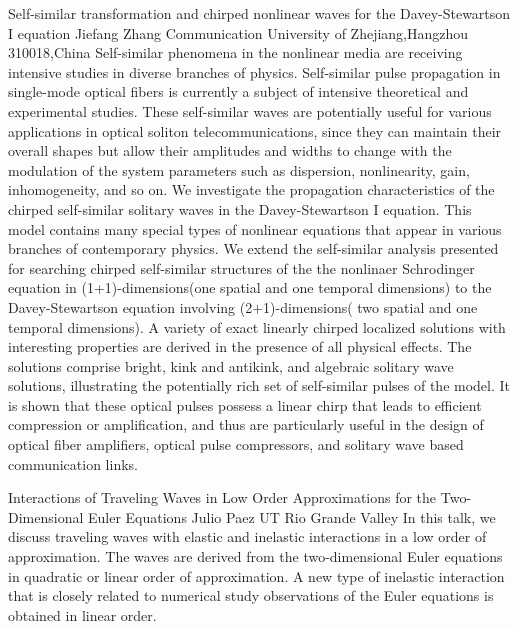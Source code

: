 \begin{addmargin}[2em]{0em}
\vspace{1.5ex}
\abs
{Self-similar transformation and chirped nonlinear waves for the Davey-Stewartson I equation}
{Jiefang Zhang}
{Communication University of Zhejiang,Hangzhou 310018,China}
{Self-similar phenomena in the nonlinear media are receiving intensive studies in diverse branches of physics. Self-similar pulse propagation in single-mode optical fibers is currently a subject of intensive theoretical and experimental studies. These self-similar waves are potentially useful for various applications in optical soliton telecommunications, since they can maintain their overall shapes but allow their amplitudes and widths to change with the modulation of the system parameters such as dispersion, nonlinearity, gain, inhomogeneity, and so on. 
We investigate the propagation characteristics of the chirped self-similar solitary waves in the Davey-Stewartson I equation. This model contains many special types of nonlinear equations that appear in various branches of contemporary physics. We extend the self-similar analysis presented for searching chirped self-similar structures of the  the nonlinaer Schrodinger equation in (1+1)-dimensions(one spatial and one temporal dimensions) to the Davey-Stewartson equation involving (2+1)-dimensions( two spatial and one temporal dimensions). A variety of exact linearly chirped localized solutions with interesting properties are derived in the presence of all physical effects. The solutions comprise bright, kink and antikink, and algebraic solitary wave solutions, illustrating the potentially rich set of self-similar pulses of the model. It is shown that these optical pulses possess a linear chirp that leads to efficient compression or amplification, and thus are particularly useful in the design of optical fiber amplifiers, optical pulse compressors, and solitary wave based communication links.
}

\vspace{1.5ex}
\abs
{Interactions of Traveling Waves in Low Order Approximations
for the Two-Dimensional Euler Equations
}
{Julio Paez}
{UT Rio Grande Valley}
{In this talk, we discuss traveling waves with elastic and inelastic interactions in a low order of approximation. The waves are derived from the two-dimensional Euler equations in quadratic or linear order of approximation.  A new type of inelastic interaction that is closely related to numerical study observations of the Euler equations is obtained in linear order.
}



\end{addmargin}
